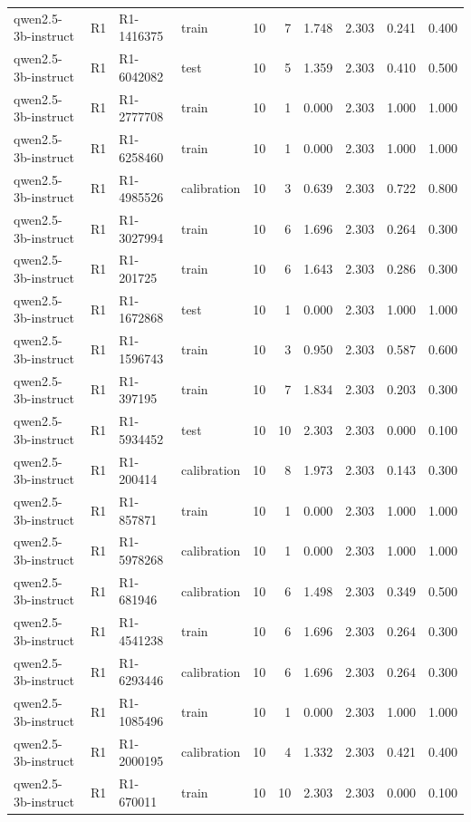 \begin{table}
\begin{tabular}{llllrrrrrr}
qwen2.5-3b-instruct & R1 & R1-1416375 & train & 10 & 7 & 1.748 & 2.303 & 0.241 & 0.400 \\
qwen2.5-3b-instruct & R1 & R1-6042082 & test & 10 & 5 & 1.359 & 2.303 & 0.410 & 0.500 \\
qwen2.5-3b-instruct & R1 & R1-2777708 & train & 10 & 1 & 0.000 & 2.303 & 1.000 & 1.000 \\
qwen2.5-3b-instruct & R1 & R1-6258460 & train & 10 & 1 & 0.000 & 2.303 & 1.000 & 1.000 \\
qwen2.5-3b-instruct & R1 & R1-4985526 & calibration & 10 & 3 & 0.639 & 2.303 & 0.722 & 0.800 \\
qwen2.5-3b-instruct & R1 & R1-3027994 & train & 10 & 6 & 1.696 & 2.303 & 0.264 & 0.300 \\
qwen2.5-3b-instruct & R1 & R1-201725 & train & 10 & 6 & 1.643 & 2.303 & 0.286 & 0.300 \\
qwen2.5-3b-instruct & R1 & R1-1672868 & test & 10 & 1 & 0.000 & 2.303 & 1.000 & 1.000 \\
qwen2.5-3b-instruct & R1 & R1-1596743 & train & 10 & 3 & 0.950 & 2.303 & 0.587 & 0.600 \\
qwen2.5-3b-instruct & R1 & R1-397195 & train & 10 & 7 & 1.834 & 2.303 & 0.203 & 0.300 \\
qwen2.5-3b-instruct & R1 & R1-5934452 & test & 10 & 10 & 2.303 & 2.303 & 0.000 & 0.100 \\
qwen2.5-3b-instruct & R1 & R1-200414 & calibration & 10 & 8 & 1.973 & 2.303 & 0.143 & 0.300 \\
qwen2.5-3b-instruct & R1 & R1-857871 & train & 10 & 1 & 0.000 & 2.303 & 1.000 & 1.000 \\
qwen2.5-3b-instruct & R1 & R1-5978268 & calibration & 10 & 1 & 0.000 & 2.303 & 1.000 & 1.000 \\
qwen2.5-3b-instruct & R1 & R1-681946 & calibration & 10 & 6 & 1.498 & 2.303 & 0.349 & 0.500 \\
qwen2.5-3b-instruct & R1 & R1-4541238 & train & 10 & 6 & 1.696 & 2.303 & 0.264 & 0.300 \\
qwen2.5-3b-instruct & R1 & R1-6293446 & calibration & 10 & 6 & 1.696 & 2.303 & 0.264 & 0.300 \\
qwen2.5-3b-instruct & R1 & R1-1085496 & train & 10 & 1 & 0.000 & 2.303 & 1.000 & 1.000 \\
qwen2.5-3b-instruct & R1 & R1-2000195 & calibration & 10 & 4 & 1.332 & 2.303 & 0.421 & 0.400 \\
qwen2.5-3b-instruct & R1 & R1-670011 & train & 10 & 10 & 2.303 & 2.303 & 0.000 & 0.100 \\

\end{tabular}
\end{table}
